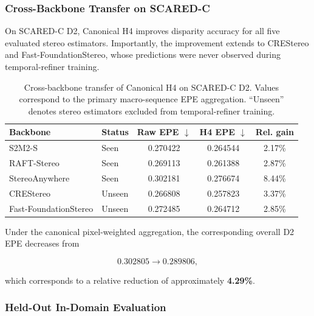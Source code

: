 \documentclass[11pt,a4paper]{article}
\begin{document}
\subsubsection{Cross-Backbone Transfer on SCARED-C}

On SCARED-C D2, Canonical H4 improves disparity accuracy for all five
evaluated stereo estimators.
Importantly, the improvement extends to CREStereo and
Fast-FoundationStereo, whose predictions were never observed during
temporal-refiner training.

\begin{table}[t]
    \centering
    \caption{
        Cross-backbone transfer of Canonical H4 on SCARED-C D2.
        Values correspond to the primary macro-sequence EPE aggregation.
        ``Unseen'' denotes stereo estimators excluded from temporal-refiner
        training.
    }
    \label{tab:scared_d2_current}
    \small
    \begin{tabular}{llccc}
        \toprule
        Backbone & Status &
        Raw EPE $\downarrow$ &
        H4 EPE $\downarrow$ &
        Rel. gain \\
        \midrule
        S2M2-S
            & Seen
            & 0.270422 & 0.264544 & 2.17\% \\

        RAFT-Stereo
            & Seen
            & 0.269113 & 0.261388 & 2.87\% \\

        StereoAnywhere
            & Seen
            & 0.302181 & 0.276674 & 8.44\% \\

        CREStereo
            & Unseen
            & 0.266808 & 0.257823 & 3.37\% \\

        Fast-FoundationStereo
            & Unseen
            & 0.272485 & 0.264712 & 2.85\% \\
        \bottomrule
    \end{tabular}
\end{table}

Under the canonical pixel-weighted aggregation, the corresponding
overall D2 EPE decreases from

\[
0.302805 \rightarrow 0.289806,
\]

which corresponds to a relative reduction of approximately
\textbf{4.29\%}.


\subsubsection{Held-Out In-Domain Evaluation}
\end{document}
